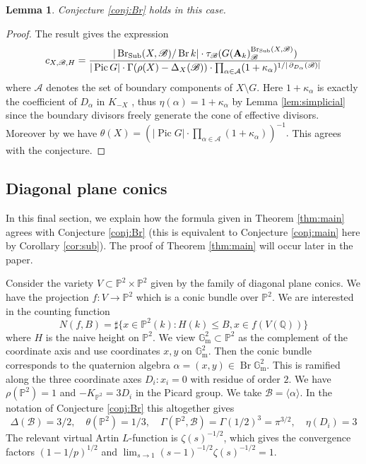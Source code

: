 \documentclass[a4paper,12pt,reqno]{amsart}
\numberwithin{equation}{section} \numberwithin{figure}{section}
\DeclareMathOperator{\Pic}{Pic} \DeclareMathOperator{\Div}{Div}
\DeclareMathOperator{\Br}{Br} \DeclareMathOperator{\Brnr}{Br_{nr}}
\renewcommand\P{\mathbb{P}}
\newcommand\Q{\mathbb{Q}}
\newcommand\G{\mathbb{G}}
\newcommand\Gm{\G_\mathrm{m}}
\newcommand{\Adele}{\mathbf{A}}
\newcommand{\br}{\mathscr{B}}
\renewcommand{\leq}{\leqslant}
\renewcommand{\#}{\sharp}
\newtheorem{lemma}{Lemma}
\theoremstyle{definition}
\numberwithin{lemma}{section}
\begin{document}
\begin{lemma}
	Conjecture \ref{conj:Br} holds in this case.
\end{lemma}
\begin{proof}
	The result \cite[Thm.~4.20]{LTBT20} gives the expression
	$$c_{X,\br,H}=\frac{|\Sub(X,\br)/\Br k| \cdot \tau_{\br}(G(\Adele_k)_{\br}^{\Sub(X,\br)})}
	{|\Pic G| \cdot \Gamma(\rho(X) - \Delta_X(\br)) \cdot
	\prod_{\alpha \in \mathcal{A}} (1+\kappa_\alpha)^{1/|\res_{D_\alpha}(\br)|}}$$
	where $\mathcal{A}$ denotes the set of boundary components of $X \setminus G$.
	Here $1 + \kappa_\alpha$ is exactly the coefficient of $D_\alpha$ in $K_{-X}$ 
	\cite[Prop.~3.3]{LTBT20}, thus $\eta(\alpha) = 1+\kappa_\alpha$ by Lemma \ref{lem:simplicial}
	since the boundary divisors freely generate the cone of effective divisors.
	Moreover by \cite[Thm.~4.21]{LTBT20} we have
	$\theta(X) = (|\Pic G| \cdot \prod_{\alpha \in \mathcal{A}} (1+\kappa_\alpha))^{-1}.$
	This agrees with the conjecture.
\end{proof}

\subsection{Diagonal plane conics} \label{sec:diag_constant}
In this final section, we explain how the formula given in Theorem \ref{thm:main} agrees with Conjecture \ref{conj:Br} (this is equivalent to Conjecture \ref{conj:main} here by Corollary \ref{cor:sub}). The proof of Theorem \ref{thm:main} will occur later in the paper.

Consider the variety $V \subset \P^2 \times \P^2$ given by the family of diagonal
plane conics. We have the projection $f: V \to \P^2$ which is a conic bundle over $\P^2$. We are interested in the counting function
$$N(f,B) =  \#\{ x \in \P^2(k) : H(k) \leq B, x \in f(V(\Q))\}$$
where $H$ is the naive height on $\P^2$.
We view $\Gm^2 \subset \P^2$ as the complement of the coordinate axis and use coordinates
$x,y$ on $\Gm^2$. Then the conic bundle corresponds to the quaternion algebra 
$\alpha = (x,y) \in \Br \Gm^2$. This is ramified along the three coordinate axes $D_i: x_i = 0$
with residue of order $2$. We have $\rho(\P^2) = 1$ and $-K_{\P^2} = 3D_i$ in the Picard group.
We take $\br = \langle \alpha \rangle$. 
In the notation of Conjecture \ref{conj:Br} this altogether gives
$$\Delta(\br) = 3/2, \quad \theta(\P^2) = 1/3, \quad \Gamma(\P^2,\br) = \Gamma(1/2)^3 = \pi^{3/2},
 \quad \eta(D_i) = 3$$
The relevant virtual Artin $L$-function is $\zeta(s)^{-1/2}$, which gives the  
convergence factors $(1-1/p)^{1/2}$ and  $\lim_{s \to 1}(s-1)^{-1/2} \zeta(s)^{-1/2} = 1$.
\end{document}
